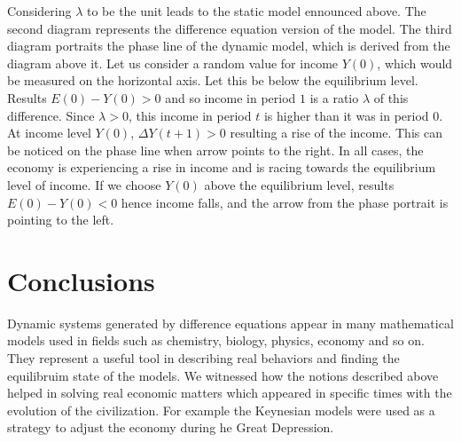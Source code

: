 \documentclass[a4paper,12pt]{report}
\begin{document}
Considering $\lambda$ to be the unit leads to the static model ennounced above. The second diagram represents the difference equation version of the model. The third diagram portraits the phase line of the dynamic model, which is derived from the diagram above it.
Let us consider a random value for income $Y(0)$, which would be measured on the horizontal axis. Let this be below the equilibrium level. Results $E(0)-Y(0)>0$ and so income in period $1$ is a ratio $\lambda$ of this difference. Since $\lambda>0$, this income in period $t$ is higher than it was in period $0$. At income level $Y(0)$, $\Delta Y(t+1)>0$ resulting a rise of the income. This can be noticed on the phase line when arrow points to the right. In all cases, the economy is experiencing a rise in income and is racing towards the equilibrium level of income. If we choose $Y(0)$ above the equilibrium level, results $E(0)-Y(0)<0$ hence income falls, and the arrow from the phase portrait is pointing to the left.



\section{Conclusions}
Dynamic systems generated by difference equations appear in many mathematical models used in fields such as chemistry, biology, physics, economy and so on. They represent a useful tool in describing real behaviors and finding the equilibruim state of the models.  We witnessed how the notions described above helped in solving real economic matters which appeared in specific times with the evolution of the civilization. For example the Keynesian models were used as a strategy to adjust the economy during he Great Depression.
\end{document}
